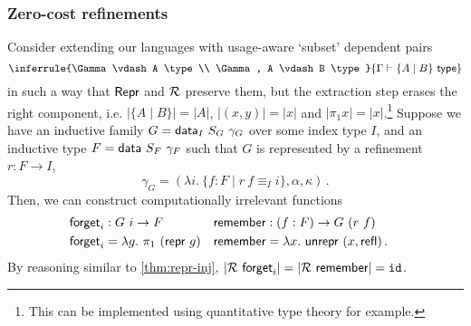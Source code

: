 \subsubsection{Zero-cost refinements}
Consider extending our languages with usage-aware
`subset' dependent pairs
\[
\inferrule{\Gamma \vdash A \type \\ \Gamma, A \vdash B \type}{\Gamma \vdash \{A \mid B\} \type}
\]
in such a way that $\textsf{Repr}$ and $\mathcal{R}$ preserve them, but the extraction
step erases the right component, i.e. $|\{A \mid B\}| = |A|$, $|(x, y)| = |x|$ and $|\pi_1 x| =
|x|$.\footnote{This can be implemented using quantitative type theory for
example.} Suppose we have an inductive family $G = \mta{data}_I\ S_G\ \gamma_G$
over some index type $I$, and an inductive type $F = \mta{data}\ S_F\ \gamma_F$
such that $G$ is represented by a refinement $r : F \to I$,
\[
    \gamma_G = (\lambda i.\ \{ f : F \mid r\ f \equiv_I i \}, \alpha, \kappa) \,.
\]
Then, we can construct computationally irrelevant functions
\begin{align*}
&\begin{aligned}
&\textsf{forget}_i : G\ i \to F \\
&\textsf{forget}_i = \lambda g.\ \pi_1\ (\textsf{repr}\ g)
\end{aligned} \quad \begin{aligned}
&\textsf{remember} : (f : F) \to G\ (r\ f) \\
&\textsf{remember} = \lambda x.\ \textsf{unrepr}\ (x, \textsf{refl}) \,.
\end{aligned}
\end{align*}
By reasoning similar to \cref{thm:repr-inj}, $|\mathcal{R}\ \textsf{forget}_i| = |\mathcal{R}\ \textsf{remember}| = \texttt{id}$.
